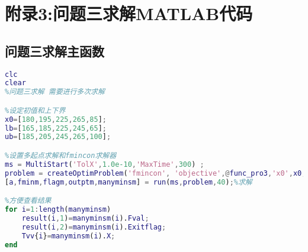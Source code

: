 \documentclass[12pt]{ctexart}
\numberwithin{figure}{section}
\numberwithin{table}{section}
\begin{document}
\section{附录3:问题三求解MATLAB代码}
\subsection{问题三求解主函数}
\begin{lstlisting}[language=MATLAB]
clc
clear
%问题三求解 需要进行多次求解

%设定初值和上下界
x0=[180,195,225,265,85];
lb=[165,185,225,245,65];
ub=[185,205,245,265,100];

%设置多起点求解和fmincon求解器
ms = MultiStart('TolX',1.0e-10,'MaxTime',300) ;
problem = createOptimProblem('fmincon', 'objective',@func_pro3,'x0',x0, 'lb',lb,'ub',ub);
[a,fminm,flagm,outptm,manyminsm] = run(ms,problem,40);%求解

%方便查看结果
for i=1:length(manyminsm)
    result(i,1)=manyminsm(i).Fval;
    result(i,2)=manyminsm(i).Exitflag;
    Tvv{i}=manyminsm(i).X;
end

\end{lstlisting}
\end{document}
